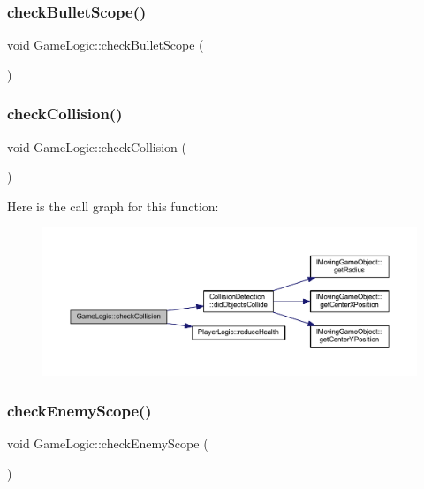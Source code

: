 \subsubsection{\texorpdfstring{check\+Bullet\+Scope()}{checkBulletScope()}}
{\footnotesize\ttfamily void Game\+Logic\+::check\+Bullet\+Scope (\begin{DoxyParamCaption}{ }\end{DoxyParamCaption})}

\mbox{\label{class_game_logic_a2ff25304164107a3f4549f108db95a23}} 
\subsubsection{\texorpdfstring{check\+Collision()}{checkCollision()}}
{\footnotesize\ttfamily void Game\+Logic\+::check\+Collision (\begin{DoxyParamCaption}{ }\end{DoxyParamCaption})}

Here is the call graph for this function\+:
\nopagebreak
\begin{figure}[H]
\begin{center}
\leavevmode
\includegraphics[width=350pt]{class_game_logic_a2ff25304164107a3f4549f108db95a23_cgraph}
\end{center}
\end{figure}
\mbox{\label{class_game_logic_a5c0dc59099b2e223c99fc4a4d51627f0}} 
\subsubsection{\texorpdfstring{check\+Enemy\+Scope()}{checkEnemyScope()}}
{\footnotesize\ttfamily void Game\+Logic\+::check\+Enemy\+Scope (\begin{DoxyParamCaption}{ }\end{DoxyParamCaption})}

